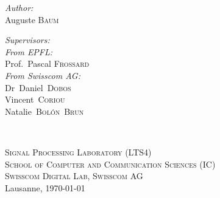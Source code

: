 \begin{titlepage}
\begin{center}
    \begin{minipage}[t]{0.4\textwidth}
    \begin{flushleft} \large
    \emph{Author:}\\
    Auguste \textsc{Baum}
    \end{flushleft}
    \end{minipage}
    \begin{minipage}[t]{0.4\textwidth}
    \begin{flushright} \large
    \emph{Supervisors:} \\
    [0.5cm]
    \emph{From EPFL:}\\
    Prof.~Pascal \textsc{Frossard}\\
    [0.2cm]
    \emph{From Swisscom AG:}\\
Dr~Daniel~\textsc{Dobos}\\
Vincent~\textsc{Coriou}\\
Natalie~\textsc{Bol\'on~Brun}
    \end{flushright}
    \end{minipage}\\[3cm]
     
    \vfill
    
    \small{\textsc{Signal Processing Laboratory (LTS4)}}\\
    \small{\textsc{School of Computer and Communication Sciences (IC)}}\\
    \small{\textsc{Swisscom Digital Lab, Swisscom AG}}\\
    [1cm]
    
    {\large Lausanne, \today}\\[2cm] %
     
    \end{center}
\end{titlepage}